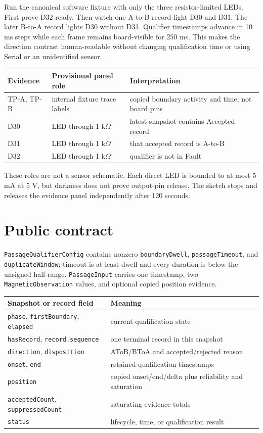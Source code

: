 \documentclass[11pt]{article}
\begin{document}
Run the canonical software fixture with only the three resistor-limited LEDs.
First prove D32 ready. Then watch one A-to-B record light D30 and D31. The
later B-to-A record lights D30 without D31. Qualifier timestamps advance in
10 ms steps while each frame remains board-visible for 250 ms. This makes the
direction contrast human-readable without changing qualification time or
using Serial or an unidentified sensor.

\begin{tabularx}{\linewidth}{@{}l l X@{}}
\toprule
Evidence & Provisional panel role & Interpretation\\
\midrule
TP-A, TP-B & internal fixture trace labels & copied boundary activity and time; not board pins\\
D30 & LED through 1 k\(\Omega\) & latest snapshot contains Accepted record\\
D31 & LED through 1 k\(\Omega\) & that accepted record is A-to-B\\
D32 & LED through 1 k\(\Omega\) & qualifier is not in Fault\\
\bottomrule
\end{tabularx}

These roles are not a sensor schematic. Each direct LED is bounded to at most
5 mA at 5 V, but darkness does not prove output-pin release. The sketch stops
and releases the evidence panel independently after 120 seconds.

\section{Public contract}

\texttt{PassageQualifierConfig} contains nonzero \texttt{boundaryDwell},
\texttt{passageTimeout}, and \texttt{duplicateWindow}; timeout is at least
dwell and every duration is below the unsigned half-range.
\texttt{PassageInput} carries one timestamp, two \texttt{MagneticObservation}
values, and optional copied position evidence.

\begin{tabularx}{\linewidth}{@{}l X@{}}
\toprule
Snapshot or record field & Meaning\\
\midrule
\texttt{phase}, \texttt{firstBoundary}, \texttt{elapsed} & current qualification state\\
\texttt{hasRecord}, \texttt{record.sequence} & one terminal record in this snapshot\\
\texttt{direction}, \texttt{disposition} & AToB/BToA and accepted/rejected reason\\
\texttt{onset}, \texttt{end} & retained qualification timestamps\\
\texttt{position} & copied onset/end/delta plus reliability and saturation\\
\texttt{acceptedCount}, \texttt{suppressedCount} & saturating evidence totals\\
\texttt{status} & lifecycle, time, or qualification result\\
\bottomrule
\end{tabularx}
\end{document}
